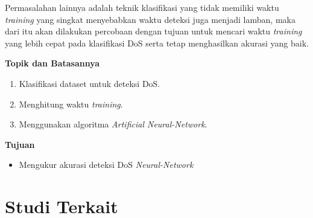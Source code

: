 Permasalahan lainnya adalah teknik klasifikasi yang tidak memiliki waktu \textit{training} yang singkat menyebabkan waktu deteksi juga menjadi lamban, maka dari itu akan dilakukan percobaan dengan tujuan untuk mencari waktu \textit{training} yang lebih cepat pada klasifikasi DoS serta tetap menghasilkan akurasi yang baik. \\

\bigskip
\noindent\textbf{Topik dan Batasannya}

\begin{enumerate}
    \item Klasifikasi dataset untuk deteksi DoS.
    \item Menghitung waktu \textit{training}.
    \item Menggunakan algoritma \textit{Artificial Neural-Network}.
\end{enumerate}

\noindent\textbf{Tujuan}

\begin{itemize}
    
    \item Mengukur akurasi deteksi DoS \textit{Neural-Network}

\end{itemize}

\section{Studi Terkait}

